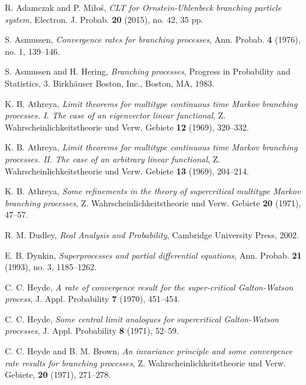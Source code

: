 \documentclass[12pt,a4paper]{amsart}
\theoremstyle{plain}
\theoremstyle{definition}
\numberwithin{equation}{section}
\begin{document}
\begin{thebibliography}{10}

	R. Adamczak and P. Mi{\l}o\'{s},
	\emph{C{LT} for {O}rnstein-{U}hlenbeck branching particle system},
	Electron. J. Probab. \textbf{20} (2015), no. 42, 35 pp.

	S. Asmussen,
	\emph{Convergence rates for branching processes},
	Ann. Probab.  \textbf{4} (1976), no. 1, 139--146.

	S. Asmussen and H. Hering,
	\emph{Branching processes},
	Progress in Probability and Statistics, 3. Birkh\"{a}user Boston, Inc., Boston, MA, 1983.

	K. B. Athreya,
	\emph{Limit theorems for multitype continuous time {M}arkov branching processes. {I}. {T}he case of an eigenvector linear functional},
	Z. Wahrscheinlichkeitstheorie und Verw. Gebiete \textbf{12} (1969), 320--332.

  	K. B. Athreya,
  	\emph{Limit theorems for multitype continuous time {M}arkov branching processes. {II}. {T}he case of an arbitrary linear functional},
  	Z. Wahrscheinlichkeitstheorie und Verw. Gebiete \textbf{13} (1969), 204--214.

  	K. B. Athreya,
  	\emph{Some refinements in the theory of supercritical multitype {M}arkov branching processes},
  	Z. Wahrscheinlichkeitstheorie und Verw. Gebiete \textbf{20} (1971), 47--57.

  	R. M. Dudley,
	\emph{Real Analysis and Probability},
  	Cambridge University Press, 2002.

  	E. B. Dynkin,
  	\emph{Superprocesses and partial differential equations},
  	Ann. Probab. \textbf{21} (1993), no. 3, 1185--1262.

	C. C. Heyde,
 	\emph{A rate of convergence result for the super-critical {G}alton-{W}atson process},
  	J. Appl. Probability \textbf{7} (1970), 451--454.

  	C. C. Heyde,
   	\emph{Some central limit analogues for supercritical {G}alton-{W}atson processes},
  	J. Appl. Probability \textbf{8} (1971), 52--59.

  	C. C. Heyde and B. M. Brown,
  	\emph{An invariance principle and some convergence rate results for branching processes},
 	Z. Wahrscheinlichkeitstheorie und Verw. Gebiete, \textbf{20} (1971), 271--278.


\end{thebibliography}
\end{document}
